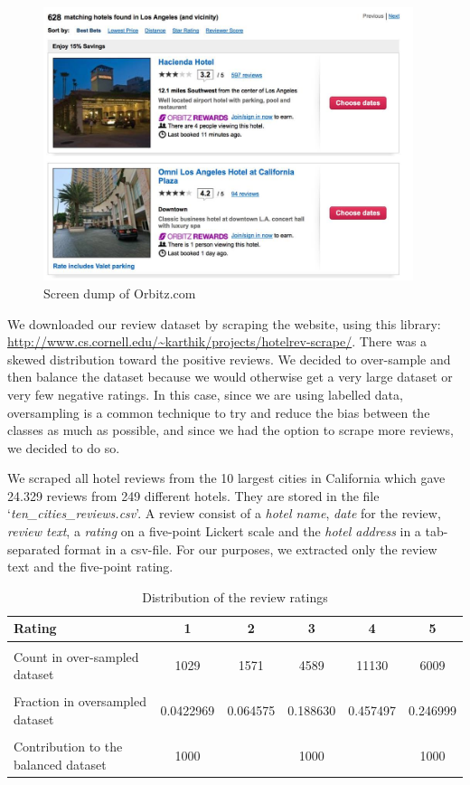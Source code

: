 \documentclass{article}
\begin{document}
\begin{figure}[!ht]
	\centering
		\includegraphics[height=8cm]{orbits}
	\caption{Screen dump of Orbitz.com}
	\label{fig:orbitz}
\end{figure}

We downloaded our review dataset by scraping the website, using this library: \url{http://www.cs.cornell.edu/~karthik/projects/hotelrev-scrape/}. There was a skewed distribution toward the positive reviews. We decided to over-sample and then balance the dataset because we would otherwise get a very large dataset or very few negative ratings. In this case, since we are using labelled data, oversampling is a common technique to try and reduce the bias between the classes as much as possible, and since we had the option to scrape more reviews, we decided to do so. 

We scraped all hotel reviews from the 10 largest cities in California which gave 24.329 reviews from 249 different hotels. They are stored in the file `\textit{ten\_cities\_reviews.csv}'. A review consist of a \textit{hotel name}, \textit{date} for the review, \textit{review text}, a \textit{rating} on a five-point Lickert scale and the \textit{hotel address} in a tab-separated format in a csv-file. For our purposes, we extracted only the review text and the five-point rating. 

\begin{table}[ht!]
  \centering
  \begin{tabular}{ p{25mm} | c | c | c | c | c |}
   
Rating & 1 & 2 & 3 & 4 & 5 \\ \hline\hline&&&&&\\
Count in over-sampled dataset & 1029  &1571& 4589& 11130& 6009\\
&&&&&\\Fraction in oversampled dataset&0.0422969& 0.064575&0.188630& 0.457497&0.246999\\
&&&&&\\Contribution to the balanced dataset&1000&&1000&&1000\\
\hline
  \end{tabular}
  \caption{Distribution of the review ratings}
  \label{tab:ratingstab}
\end{table}
\end{document}
